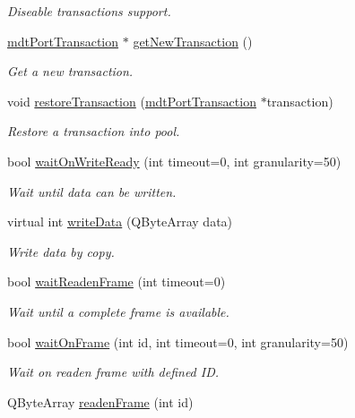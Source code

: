 \begin{DoxyCompactItemize}
\begin{DoxyCompactList}\small\item\em Diseable transactions support. \end{DoxyCompactList}\item 
\hyperlink{classmdt_port_transaction}{mdtPortTransaction} $\ast$ \hyperlink{classmdt_port_manager_a75ebd3d1859e3ed38b9558981e53aac4}{getNewTransaction} ()
\begin{DoxyCompactList}\small\item\em Get a new transaction. \end{DoxyCompactList}\item 
void \hyperlink{classmdt_port_manager_a5fea4a9b8e94d38e8ec699dba05c7ca8}{restoreTransaction} (\hyperlink{classmdt_port_transaction}{mdtPortTransaction} $\ast$transaction)
\begin{DoxyCompactList}\small\item\em Restore a transaction into pool. \end{DoxyCompactList}\item 
bool \hyperlink{classmdt_port_manager_a1ca92c5ac120d87e5b10bff54ed1aa5c}{waitOnWriteReady} (int timeout=0, int granularity=50)
\begin{DoxyCompactList}\small\item\em Wait until data can be written. \end{DoxyCompactList}\item 
virtual int \hyperlink{classmdt_port_manager_a8b60d53d6e553f15dedec916f9c1614b}{writeData} (QByteArray data)
\begin{DoxyCompactList}\small\item\em Write data by copy. \end{DoxyCompactList}\item 
bool \hyperlink{classmdt_port_manager_ad87eff1f2dd54a165a78b34e30592901}{waitReadenFrame} (int timeout=0)
\begin{DoxyCompactList}\small\item\em Wait until a complete frame is available. \end{DoxyCompactList}\item 
bool \hyperlink{classmdt_port_manager_a680546498a0cd486c4fc16d28f44e4c6}{waitOnFrame} (int id, int timeout=0, int granularity=50)
\begin{DoxyCompactList}\small\item\em Wait on readen frame with defined ID. \end{DoxyCompactList}\item 
QByteArray \hyperlink{classmdt_port_manager_a830ae182d06dd6a52c43a7f45b9240ac}{readenFrame} (int id)

\end{DoxyCompactItemize}
